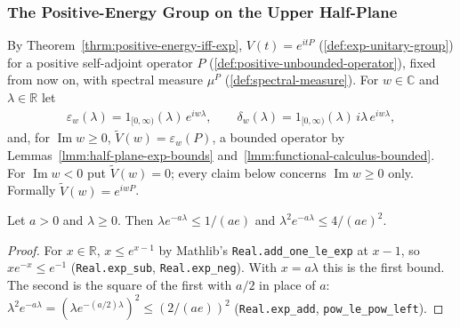 \subsubsection{The Positive-Energy Group on the Upper Half-Plane}

By Theorem~\ref{thrm:positive-energy-iff-exp}, $V(t) = e^{itP}$ (\ref{def:exp-unitary-group}) for a positive self-adjoint operator $P$ (\ref{def:positive-unbounded-operator}), fixed from now on, with spectral measure $\mu^P$ (\ref{def:spectral-measure}). For $w \in \mathbb{C}$ and $\lambda \in \mathbb{R}$ let
\begin{align}
    \varepsilon_w(\lambda) = 1_{[0,\infty)}(\lambda)\,e^{iw\lambda}, \qquad \delta_w(\lambda) = 1_{[0,\infty)}(\lambda)\,i\lambda\,e^{iw\lambda},
\end{align}
and, for $\operatorname{Im} w \ge 0$, $\widetilde{V}(w) = \varepsilon_w(P)$, a bounded operator by Lemmas~\ref{lmm:half-plane-exp-bounds} and~\ref{lmm:functional-calculus-bounded}. For $\operatorname{Im} w < 0$ put $\widetilde{V}(w) = 0$; every claim below concerns $\operatorname{Im} w \ge 0$ only. Formally $\widetilde{V}(w) = e^{iwP}$.

\begin{lemma}
    \label{lmm:poly-exp-decay}
    \leanok
    Let $a > 0$ and $\lambda \ge 0$. Then $\lambda e^{-a\lambda} \le 1/(ae)$ and $\lambda^2 e^{-a\lambda} \le 4/(ae)^2$.
\end{lemma}
\begin{proof}
    \leanok
    For $x \in \mathbb{R}$, $x \le e^{x - 1}$ by Mathlib's \texttt{Real.add\_one\_le\_exp} at $x - 1$, so $xe^{-x} \le e^{-1}$ (\texttt{Real.exp\_sub}, \texttt{Real.exp\_neg}). With $x = a\lambda$ this is the first bound. The second is the square of the first with $a/2$ in place of $a$: $\lambda^2 e^{-a\lambda} = (\lambda e^{-(a/2)\lambda})^2 \le (2/(ae))^2$ (\texttt{Real.exp\_add}, \texttt{pow\_le\_pow\_left}).
\end{proof}

